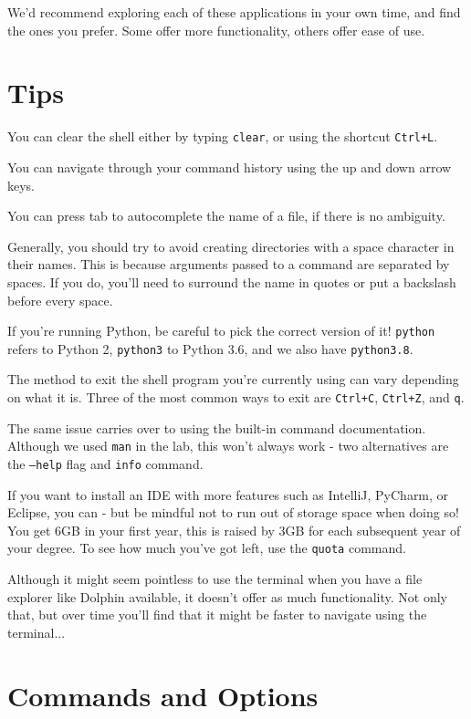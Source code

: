 \documentclass[a4paper,11pt,parskip=half-]{scrartcl}
\begin{document}
\raggedright

We'd recommend exploring each of these applications in your own time, and find the ones you prefer. Some offer more functionality, others offer ease of use.

\section*{Tips}

You can clear the shell either by typing \texttt{clear}, or using the shortcut \texttt{Ctrl+L}.

You can navigate through your command history using the up and down arrow keys.

You can press tab to autocomplete the name of a file, if there is no ambiguity.

Generally, you should try to avoid creating directories with a space character in their names. 
This is because arguments passed to a command are separated by spaces.
If you do, you'll need to surround the name in quotes or put a backslash before every space.

If you're running Python, be careful to pick the correct version of it! 
\texttt{python} refers to Python 2, \texttt{python3} to Python 3.6, and we also have \texttt{python3.8}.

The method to exit the shell program you're currently using can vary depending on what it is.
Three of the most common ways to exit are \texttt{Ctrl+C}, \texttt{Ctrl+Z}, and \texttt{q}.

The same issue carries over to using the built-in command documentation. 
Although we used \texttt{man} in the lab, this won't always work - two alternatives are the \texttt{---help} flag and \texttt{info} command.

If you want to install an IDE with more features such as IntelliJ, PyCharm, or Eclipse, you can 
- but be mindful not to run out of storage space when doing so! 
You get 6GB in your first year, this is raised by 3GB for each subsequent year of your degree. 
To see how much you've got left, use the \texttt{quota} command.

Although it might seem pointless to use the terminal when you have a file explorer like Dolphin available, it doesn't offer as much functionality. Not only that, but over time you'll find that it might be faster to navigate using the terminal...

\newpage

\section*{Commands and Options}
\end{document}

